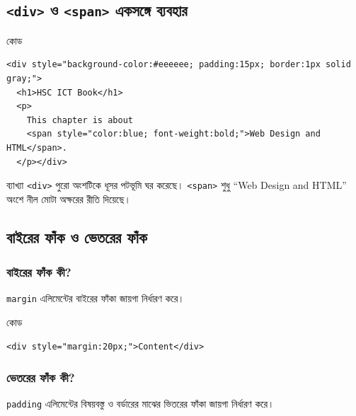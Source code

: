 \subsection{\texttt{<div>} ও \texttt{<span>} একসঙ্গে ব্যবহার}

\begin{examplebox}{কোড}

\begin{verbatim}
<div style="background-color:#eeeeee; padding:15px; border:1px solid gray;">
  <h1>HSC ICT Book</h1>
  <p>
    This chapter is about
    <span style="color:blue; font-weight:bold;">Web Design and HTML</span>.
  </p></div>
\end{verbatim}

\end{examplebox}

\begin{keypointbox}{ব্যাখ্যা}
\texttt{<div>} পুরো অংশটিকে ধূসর পটভূমি ঘর করেছে। \texttt{<span>} শুধু ``Web Design and HTML'' অংশে নীল মোটা অক্ষরের রীতি দিয়েছে।
\end{keypointbox}

\subsection{বাইরের ফাঁক ও ভেতরের ফাঁক}

\subsubsection{বাইরের ফাঁক কী?}

\texttt{margin} এলিমেন্টের বাইরের ফাঁকা জায়গা নির্ধারণ করে।

\begin{examplebox}{কোড}
\par\noindent\begin{minipage}{\linewidth}
\begin{verbatim}
<div style="margin:20px;">Content</div>
\end{verbatim}
\end{minipage}\par
\end{examplebox}

\subsubsection{ভেতরের ফাঁক কী?}

\texttt{padding} এলিমেন্টের বিষয়বস্তু ও বর্ডারের মাঝের ভিতরের ফাঁকা জায়গা নির্ধারণ করে।

